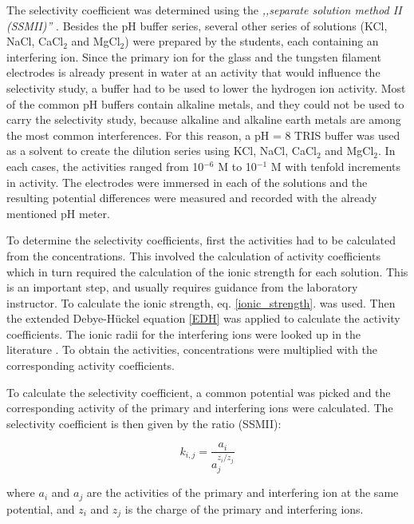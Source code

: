 \documentclass[manuscript=article, journal=jceda8]{achemso}
\begin{document}
The selectivity coefficient was determined using the \emph{,,separate solution method II (SSMII)''} \cite{buck1994recommendations}. Besides the pH buffer series, several other series of solutions (KCl, NaCl, CaCl$_2$ and MgCl$_2$) were prepared by the students, each containing an interfering ion. Since the primary ion for the glass and the tungsten filament electrodes is already present in water at an activity that would influence the selectivity study, a buffer had to be used to lower the hydrogen ion activity. Most of the common pH buffers contain alkaline metals, and they could not be used to carry the selectivity study, because alkaline and alkaline earth metals are among the most common interferences. For this reason, a pH = 8 TRIS buffer was used as a solvent to create the dilution series using KCl, NaCl, CaCl$_2$ and MgCl$_2$. In each cases, the activities ranged from 10$^{-6}$ M to 10$^{-1}$ M with tenfold increments in activity. The electrodes were immersed in each of the solutions and the resulting potential differences were measured and recorded with the already mentioned pH meter. 

To determine the selectivity coefficients, first the activities had to be calculated from the concentrations. This involved the calculation of activity coefficients which in turn required the calculation of the ionic strength for each solution. This is an important step, and usually requires guidance from the laboratory instructor. To calculate the ionic strength, eq. \ref{ionic_strength}. was used. Then the extended Debye-Hückel equation \ref{EDH} was applied to calculate the activity coefficients. The ionic radii for the interfering ions were looked up in the literature \cite{kielland1937individual}. To obtain the activities, concentrations were multiplied with the corresponding activity coefficients.

To calculate the selectivity coefficient, a common potential was picked and the corresponding activity of the primary and interfering ions were calculated. The selectivity coefficient is then given by the ratio (SSMII):

\begin{equation}
k_{i,j} = \frac{a_i} {a_j^{z_i/z_j}}
\end{equation}

where $a_i$ and $a_j$ are the activities of the primary and interfering ion at the same potential, and $z_i$ and $z_j$ is the charge of the primary and interfering ions.
\end{document}
